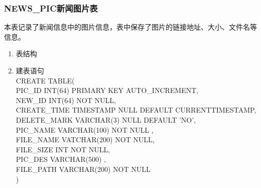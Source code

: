 \subsubsection{NEWS\_PIC新闻图片表}
本表记录了新闻信息中的图片信息，表中保存了图片的链接地址、大小、文件名等信息。
\begin{enumerate}
    \item 表结构
    \begin{table}[htbp]
        \centering
        \end{table}
    \item 建表语句\\
        CREATE TABLE(\\
            PIC\_ID INT(64) PRIMARY KEY AUTO\_INCREMENT,\\
            NEW\_ID INT(64) NOT NULL,\\
            CREATE\_TIME TIMESTAMP NULL DEFAULT CURRENTTIMESTAMP,\\
            DELETE\_MARK VARCHAR(3) NULL DEFAULT 'NO',\\
            PIC\_NAME VARCHAR(100) NOT NULL ,\\
            FILE\_NAME VATCHAR(200) NOT NULL,\\
            FILE\_SIZE INT NOT NULL,\\
            PIC\_DES VARCHAR(500) ,\\
            FILE\_PATH VARCHAR(200) NOT NULL\\
        )
    \end{enumerate}

